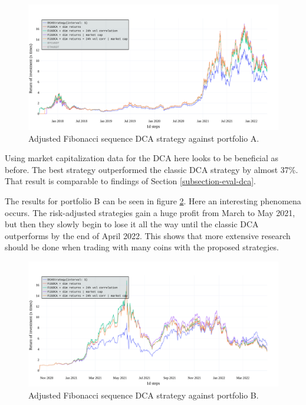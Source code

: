 \begin{figure}[!hbt]
    \centering
    \includegraphics[width=\columnwidth]{figures/fibseq-portfolio-A.pdf}
    \caption{Adjusted Fibonacci sequence DCA strategy against portfolio A.}
    \label{figure-fibseq-portfolio-A}
\end{figure}

Using market capitalization data for the DCA here looks to be beneficial as before. The best strategy outperformed the classic DCA strategy by almost 37\%. That result is comparable to findings of Section \ref{subsection-eval-dca}.

The results for portfolio B can be seen in figure \ref{figure-fibseq-portfolio-B}. Here an interesting phenomena occurs. The risk-adjusted strategies gain a huge profit from March to May 2021, but then they slowly begin to lose it all the way until the classic DCA outperforms by the end of April 2022. This shows that more extensive research should be done when trading with many coins with the proposed strategies.

\begin{figure}[!hbt]
    \centering
    \includegraphics[width=\columnwidth]{figures/fibseq-portfolio-B.pdf}
    \caption{Adjusted Fibonacci sequence DCA strategy against portfolio B.}
    \label{figure-fibseq-portfolio-B}
\end{figure}

